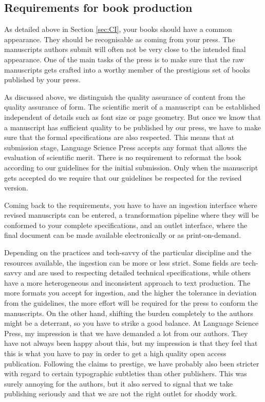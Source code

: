 \documentclass[guidelines,nonflat,modfonts] {langsci/langscibook}
\begin{document}
 
\subsection{Requirements for book production}
As detailed above in Section \ref{sec:CI}, your books should have a common appearance. They should be recognisable as coming from your press. The manuscripts authors submit will often not be very close to the intended final appearance. One of the main tasks of the press is to make sure that the raw manuscripts gets crafted into a worthy member of the prestigious set of books published by your press. 

As discussed above, we distinguish the quality assurance of content from the quality assurance of form. The scientific merit of a manuscript can be established independent of details such as font size or page geometry. But once we know that a manuscript has sufficient quality to be published by our press, we have to make sure that the formal specifications are also respected. This means that at submission stage, Language Science Press accepts any format that allows the evaluation of scientific merit. There is no requirement to reformat the book according to our guidelines for the initial submission. Only when the manuscript gets accepted do we require that our guidelines be respected for the revised version. 

Coming back to the requirements, you have to have an ingestion interface where revised manuscripts can be entered, a transformation pipeline where they will be conformed to your complete specifications, and an outlet interface, where the final document can be made available electronically or as print-on-demand.

Depending on the practices and tech-savvy of the particular discipline and the resources available, the ingestion can be more or less strict. Some fields are tech-savvy and are used to respecting detailed technical specifications, while others have a more heterogeneous and inconsistent approach to text production. The more formats you accept for ingestion, and the higher the tolerance in deviation from the guidelines, the more effort will be required for the press to conform the manuscripts. On the other hand, shifting the burden completely to the authors might be a deterrant, so you have to strike a good balance. At Language Science Press, my impression is that we have demanded a lot from our authors. They have not always been happy about this, but my impression is that they feel that this is what you have to pay in order to get a high quality open access publication. Following the claims to prestige, we have probably also been stricter with regard to certain typographic subtleties than other publishers. This was surely annoying for the authors, but it also served to signal that we take publishing seriously and that we are not the right outlet for shoddy work. 
\end{document}
